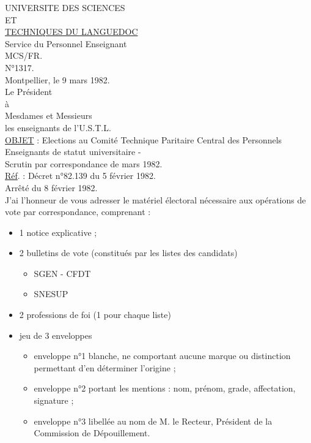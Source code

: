 UNIVERSITE DES SCIENCES\\
ET\\
\uline{TECHNIQUES DU LANGUEDOC}\\
Service du Personnel Enseignant\\
MCS/FR.\\
N°1317.\\

Montpellier, le 9 mars 1982.\\

Le Président\\
à\\
Mesdames et Messieurs\\
les enseignants de l'U.S.T.L.\\

\uline{OBJET} : Elections au Comité Technique Paritaire Central des Personnels Enseignants de statut universitaire -\\
Scrutin par correspondance de mars 1982.\\

\uline{Réf}. : Décret n°82.139 du 5 février 1982.\\
Arrêté du 8 février 1982.\\

J'ai l'honneur de vous adresser le matériel électoral nécessaire aux opérations de vote par correspondance, comprenant :

\begin{itemize}[label={-}]
\item 1 notice explicative ;
\item 2 bulletins de vote (constitués par les listes des candidats)
\begin{itemize}[label={.}]
\item SGEN - CFDT
\item SNESUP
\end{itemize}
\item 2 professions de foi (1 pour chaque liste)
\item jeu de 3 enveloppes
\begin{itemize}[label={.}]
\item enveloppe n°1 blanche, ne comportant aucune marque ou distinction permettant d'en déterminer l'origine ;
\item enveloppe n°2 portant les mentions : nom, prénom, grade, affectation, signature ;
\item enveloppe n°3 libellée au nom de M. le Recteur, Président de la Commission de Dépouillement.
\end{itemize}
\end{itemize}

